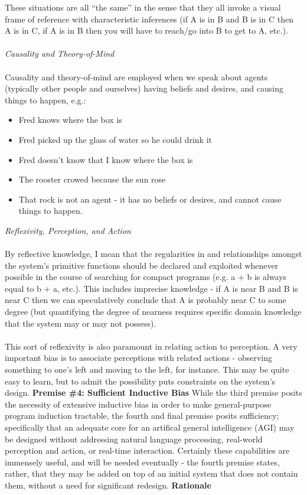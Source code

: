 \documentclass[twoside,11pt]{article}
\begin{document}
 These situations are all ``the same'' in the sense that they all invoke a visual frame of reference with characteristic inferences (if A is in B and B is in C then A is in C, if A is in B then you will have to reach/go into B to get to A, etc.).\\ 
\\ 
\emph{Causality and Theory-of-Mind}
\\ 
\\ 
 Causality and theory-of-mind are employed when we speak about agents (typically other people and ourselves) having beliefs and desires, and causing things to happen, e.g.: \begin{itemize}
\item Fred knows where the box is
\item Fred picked up the glass of water so he could drink it
\item Fred doesn't know that I know where the box is
\item The rooster crowed because the sun rose
\item That rock is not an agent - it has no beliefs or desires, and cannot cause things to happen.

\end{itemize}
\emph{Reflexivity, Perception, and Action}
\\ 
\\ 
 By reflective knowledge, I mean that the regularities in and relationships amongst the system's primitive functions should be declared and exploited whenever possible in the course of searching for compact programs (e.g. a + b is always equal to b + a, etc.). This includes imprecise knowledge - if A is near B and B is near C then we can speculatively conclude that A is probably near C to some degree (but quantifying the degree of nearness requires specific domain knowledge that the system may or may not possess).\\ 
\\ 
 This sort of reflexivity is also paramount in relating action to perception. A very important bias is to associate perceptions with related actions - observing something to one's left and moving to the left, for instance. This may be quite easy to learn, but to admit the possibility puts constraints on the system's design. \textbf{Premise \#4: Sufficient Inductive Bias}
 While the third premise posits the necessity of extensive inductive bias in order to make general-purpose program induction tractable, the fourth and final premise posits sufficiency; specifically that an adequate core for an artifical general intelligence (AGI) may be designed without addressing natural language processing, real-world perception and action, or real-time interaction. Certainly these capabilities are immensely useful, and will be needed eventually - the fourth premise states, rather, that they may be added on top of an initial system that does not contain them, without a need for significant redesign. \textbf{Rationale}
\end{document}
